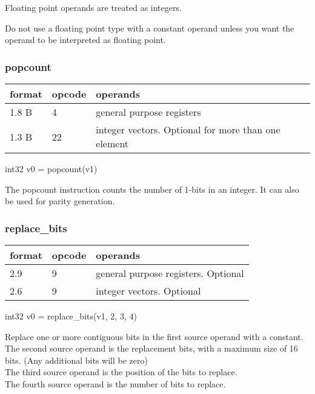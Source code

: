 \documentclass[forwardcom.tex]{subfiles}
\begin{document}
Floating point operands are treated as integers.

Do not use a floating point type with a constant operand unless you want the operand to be interpreted as floating point.


\subsubsection{popcount}
\label{table:popcountInstruction}
\begin{tabular}{|p{12mm}|p{12mm}|p{110mm}|}
\hline
\bfseries format & \bfseries opcode & \bfseries operands \\ \hline
1.8 B &  4 & general purpose registers \\ \hline
1.3 B & 22 & integer vectors. Optional for more than one element \\ \hline
\end{tabular}
\vspace{2mm}

int32 v0 = popcount(v1)
\vspace{2mm}

The popcount instruction counts the number of 1-bits in an integer. It can also be used for parity generation.
\vspace{2mm}


\subsubsection{replace\_bits}
\label{table:replaceBitsInstruction}
\begin{tabular}{|p{12mm}|p{12mm}|p{110mm}|}
\hline
\bfseries format & \bfseries opcode & \bfseries operands \\ \hline
2.9 & 9 & general purpose registers. Optional \\ \hline
2.6 & 9 & integer vectors. Optional \\ \hline
\end{tabular}
\vspace{2mm}

int32 v0 = replace\_bits(v1, 2, 3, 4) 
\vspace{2mm}

Replace one or more contiguous bits in the first source operand with a constant.\\
The second source operand is the replacement bits, with a maximum size of 16 bits. (Any additional bits will be zero)\\
The third source operand is the position of the bits to replace.\\
The fourth source operand is the number of bits to replace.
\vspace{2mm}
\end{document}
